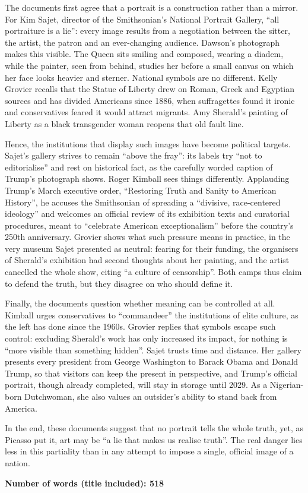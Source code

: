 \documentclass[11pt,a4paper]{article}
\begin{document}
The documents first agree that a portrait is a construction rather than a mirror. For Kim Sajet, director of the Smithsonian's National Portrait Gallery, ``all portraiture is a lie'': every image results from a negotiation between the sitter, the artist, the patron and an ever-changing audience. Dawson's photograph makes this visible. The Queen sits smiling and composed, wearing a diadem, while the painter, seen from behind, studies her before a small canvas on which her face looks heavier and sterner. National symbols are no different. Kelly Grovier recalls that the Statue of Liberty drew on Roman, Greek and Egyptian sources and has divided Americans since 1886, when suffragettes found it ironic and conservatives feared it would attract migrants. Amy Sherald's painting of Liberty as a black transgender woman reopens that old fault line.

Hence, the institutions that display such images have become political targets. Sajet's gallery strives to remain ``above the fray'': its labels try ``not to editorialise'' and rest on historical fact, as the carefully worded caption of Trump's photograph shows. Roger Kimball sees things differently. Applauding Trump's March executive order, ``Restoring Truth and Sanity to American History'', he accuses the Smithsonian of spreading a ``divisive, race-centered ideology'' and welcomes an official review of its exhibition texts and curatorial procedures, meant to ``celebrate American exceptionalism'' before the country's 250th anniversary. Grovier shows what such pressure means in practice, in the very museum Sajet presented as neutral: fearing for their funding, the organisers of Sherald's exhibition had second thoughts about her painting, and the artist cancelled the whole show, citing ``a culture of censorship''. Both camps thus claim to defend the truth, but they disagree on who should define it.

Finally, the documents question whether meaning can be controlled at all. Kimball urges conservatives to ``commandeer'' the institutions of elite culture, as the left has done since the 1960s. Grovier replies that symbols escape such control: excluding Sherald's work has only increased its impact, for nothing is ``more visible than something hidden''. Sajet trusts time and distance. Her gallery presents every president from George Washington to Barack Obama and Donald Trump, so that visitors can keep the present in perspective, and Trump's official portrait, though already completed, will stay in storage until 2029. As a Nigerian-born Dutchwoman, she also values an outsider's ability to stand back from America.

In the end, these documents suggest that no portrait tells the whole truth, yet, as Picasso put it, art may be ``a lie that makes us realise truth''. The real danger lies less in this partiality than in any attempt to impose a single, official image of a nation.

\textbf{Number of words (title included): 518}
\end{document}
